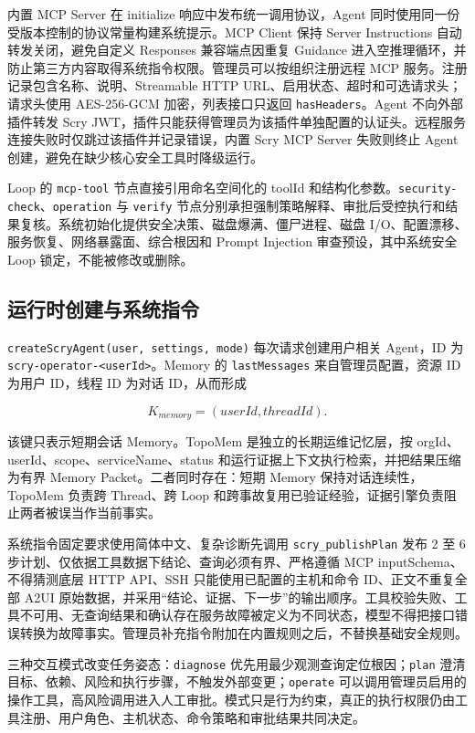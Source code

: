 \documentclass[conference,10pt]{IEEEtran}
\newcommand{\code}[1]{\texttt{#1}}
\begin{document}
内置 MCP Server 在 initialize 响应中发布统一调用协议，Agent 同时使用同一份受版本控制的协议常量构建系统提示。MCP Client 保持 Server Instructions 自动转发关闭，避免自定义 Responses 兼容端点因重复 Guidance 进入空推理循环，并防止第三方内容取得系统指令权限。管理员可以按组织注册远程 MCP 服务。注册记录包含名称、说明、Streamable HTTP URL、启用状态、超时和可选请求头；请求头使用 AES-256-GCM 加密，列表接口只返回 \code{hasHeaders}。Agent 不向外部插件转发 Scry JWT，插件只能获得管理员为该插件单独配置的认证头。远程服务连接失败时仅跳过该插件并记录错误，内置 Scry MCP Server 失败则终止 Agent 创建，避免在缺少核心安全工具时降级运行。

Loop 的 \code{mcp-tool} 节点直接引用命名空间化的 toolId 和结构化参数。\code{security-check}、\code{operation} 与 \code{verify} 节点分别承担强制策略解释、审批后受控执行和结果复核。系统初始化提供安全决策、磁盘爆满、僵尸进程、磁盘 I/O、配置漂移、服务恢复、网络暴露面、综合根因和 Prompt Injection 审查预设，其中系统安全 Loop 锁定，不能被修改或删除。

\subsection{运行时创建与系统指令}

\code{createScryAgent(user, settings, mode)} 每次请求创建用户相关 Agent，ID 为 \code{scry-operator-<userId>}。Memory 的 \code{lastMessages} 来自管理员配置，资源 ID 为用户 ID，线程 ID 为对话 ID，从而形成

\begin{equation}
  K_{memory} = (userId, threadId).
\end{equation}

该键只表示短期会话 Memory。TopoMem 是独立的长期运维记忆层，按 orgId、userId、scope、serviceName、status 和运行证据上下文执行检索，并把结果压缩为有界 Memory Packet。二者同时存在：短期 Memory 保持对话连续性，TopoMem 负责跨 Thread、跨 Loop 和跨事故复用已验证经验，证据引擎负责阻止两者被误当作当前事实。

系统指令固定要求使用简体中文、复杂诊断先调用 \code{scry\_publishPlan} 发布 2 至 6 步计划、仅依据工具数据下结论、查询必须有界、严格遵循 MCP inputSchema、不得猜测底层 HTTP API、SSH 只能使用已配置的主机和命令 ID、正文不重复全部 A2UI 原始数据，并采用“结论、证据、下一步”的输出顺序。工具校验失败、工具不可用、无查询结果和确认存在服务故障被定义为不同状态，模型不得把接口错误转换为故障事实。管理员补充指令附加在内置规则之后，不替换基础安全规则。

三种交互模式改变任务姿态：\code{diagnose} 优先用最少观测查询定位根因；\code{plan} 澄清目标、依赖、风险和执行步骤，不触发外部变更；\code{operate} 可以调用管理员启用的操作工具，高风险调用进入人工审批。模式只是行为约束，真正的执行权限仍由工具注册、用户角色、主机状态、命令策略和审批结果共同决定。
\end{document}
